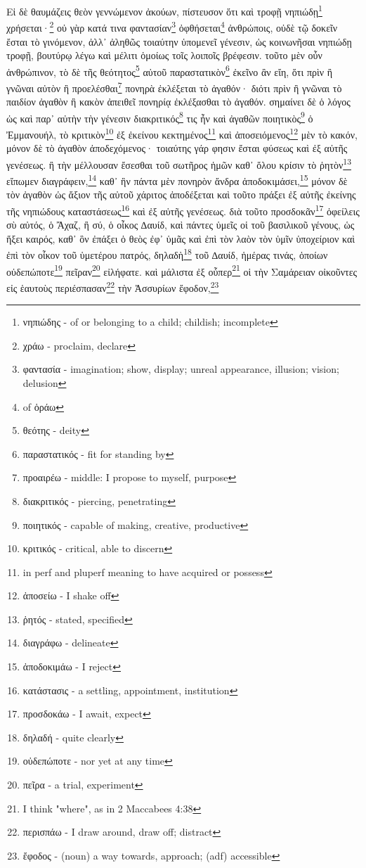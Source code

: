 

Εἰ
δὲ
θαυμάζεις
θεὸν
γεννώμενον
ἀκούων,
πίστευσον
ὅτι
καὶ
τροφῇ
νηπιώδῃ\footnote{νηπιώδης - of or belonging to a child; childish; incomplete}
χρήσεται·\footnote{χράω - proclaim, declare}
οὐ
γὰρ
κατά
τινα
φαντασίαν\footnote{φαντασία - imagination; show, display; unreal appearance, illusion; vision; delusion}
ὀφθήσεται\footnote{ of ὁράω}
ἀνθρώποις,
οὐδὲ
τῷ
δοκεῖν
ἔσται
τὸ
γινόμενον,
ἀλλ᾽
ἀληθῶς
τοιαύτην
ὑπομενεῖ
γένεσιν,
ὡς
κοινωνῆσαι
νηπιώδῃ
τροφῇ,
βουτύρῳ
λέγω
καὶ
μέλιτι
ὁμοίως
τοῖς
λοιποῖς
βρέφεσιν.
τοῦτο
μὲν οὖν
ἀνθρώπινον,
τὸ
δὲ
τῆς
θεότητος\footnote{θεότης - deity}
αὐτοῦ
παραστατικὸν\footnote{παραστατικός - fit for standing by}
ἐκεῖνο
ἂν
εἴη,
ὅτι
πρὶν
ἢ
γνῶναι
αὐτὸν
ἢ
προελέσθαι\footnote{προαιρέω - middle: I propose to myself, purpose}
πονηρὰ
ἐκλέξεται
τὸ
ἀγαθόν·
διότι
πρὶν
ἢ
γνῶναι
τὸ
παιδίον
ἀγαθὸν
ἢ
κακὸν
ἀπειθεῖ
πονηρίᾳ
ἐκλέξασθαι
τὸ
ἀγαθόν.
σημαίνει
δὲ
ὁ
λόγος
ὡς
καὶ
παρ᾽
αὐτὴν
τὴν
γένεσιν
διακριτικός\footnote{διακριτικός - piercing, penetrating}
τις
ἦν
καὶ
ἀγαθῶν
ποιητικὸς\footnote{ποιητικός - capable of making, creative, productive}
ὁ
Ἐμμανουήλ,
τὸ
κριτικὸν\footnote{κριτικός - critical, able to discern}
ἐξ
ἐκείνου
κεκτημένος\footnote{in perf and pluperf meaning to have acquired or possess}
καὶ
ἀποσειόμενος\footnote{ἀποσείω - I shake off}
μὲν
τὸ
κακόν,
μόνον
δὲ
τὸ
ἀγαθὸν
ἀποδεχόμενος·
τοιαύτης
γάρ
φησιν
ἔσται
φύσεως
καὶ
ἐξ
αὐτῆς
γενέσεως.
ἢ
τὴν
μέλλουσαν
ἔσεσθαι
τοῦ
σωτῆρος
ἡμῶν
καθ᾽
ὅλου
κρίσιν
τὸ
ῥητὸν\footnote{ῥητός - stated, specified}
εἴπωμεν
διαγράφειν,\footnote{διαγράφω - delineate}
καθ᾽
ἣν
πάντα
μὲν
πονηρὸν
ἄνδρα
ἀποδοκιμάσει,\footnote{ἀποδοκιμάω - I reject}
μόνον
δὲ
τὸν
ἀγαθὸν
ὡς
ἄξιον
τῆς
αὐτοῦ
χάριτος
ἀποδέξεται
καὶ
τοῦτο
πράξει
ἐξ
αὐτῆς
ἐκείνης
τῆς
νηπιώδους
καταστάσεως\footnote{κατάστασις - a settling, appointment, institution}
καὶ
ἐξ
αὐτῆς
γενέσεως.
διὰ
τοῦτο
προσδοκᾶν\footnote{προσδοκάω - I await, expect}
ὀφείλεις
σὺ
αὐτός,
ὁ
Ἄχαζ,
ἢ
σύ,
ὁ
οἶκος
∆αυίδ,
καὶ
πάντες
ὑμεῖς
οἱ
τοῦ
βασιλικοῦ
γένους,
ὡς
ἥξει
καιρός,
καθ᾽
ὃν
ἐπάξει
ὁ
θεὸς
ἐφ᾽
ὑμᾶς
καὶ
ἐπὶ
τὸν
λαὸν
τὸν
ὑμῖν
ὑποχείριον
καὶ
ἐπὶ
τὸν
οἶκον
τοῦ
ὑμετέρου
πατρός,
δηλαδὴ\footnote{δηλαδή - quite clearly}
τοῦ
∆αυίδ,
ἡμέρας
τινάς,
ὁποίων
οὐδεπώποτε\footnote{οὐδεπώποτε - nor yet at any time}
πεῖραν\footnote{πεῖρα - a trial, experiment}
εἰλήφατε.
καὶ
μάλιστα
ἐξ
οὗπερ\footnote{I think "where", as in 2 Maccabees 4:38}
οἱ
τὴν
Σαμάρειαν
οἰκοῦντες
εἰς
ἑαυτοὺς
περιέσπασαν\footnote{περισπάω - I draw around, draw off; distract}
τὴν
Ἀσσυρίων
ἔφοδον,\footnote{ἔφοδος - (noun) a way towards, approach; (adf) accessible}
